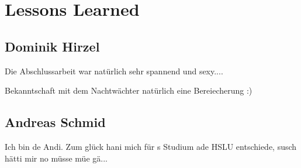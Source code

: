 \section{Lessons Learned}
\label{sec:Lessons_Learned}

\subsection{Dominik Hirzel}
Die Abschlussarbeit war natürlich sehr spannend und sexy....

Bekanntschaft mit dem Nachtwächter natürlich eine Bereiecherung :)

\subsection{Andreas Schmid}
Ich bin de Andi. Zum glück hani mich für s Studium ade HSLU entschiede, susch hätti mir no müsse müe gä...
